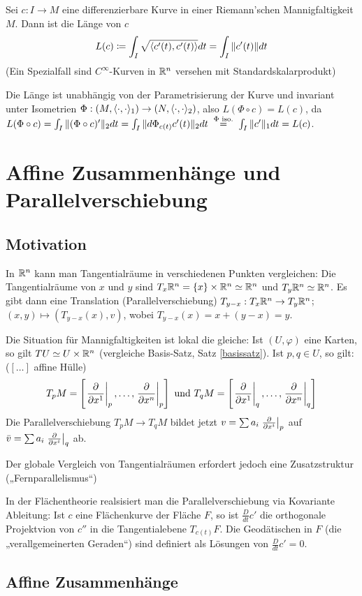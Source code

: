 \documentclass[a4paper,twoside,DIV15,BCOR12mm]{scrbook}
\renewcommand{\da}{\coloneqq}
\begin{document}
Sei $c: I \to M$ eine differenzierbare Kurve in einer Riemann’schen Mannigfaltigkeit $M$. Dann ist die Länge von $c$
\[
L(c) \da \int_I \sqrt{\ksp {c'(t)}{c'(t)}}dt  = \int _I \|c'(t)\|dt
\]
(Ein Spezialfall sind $C^\infty$-Kurven in $\mathbb{R}^n$ versehen mit Standardskalarprodukt)

Die Länge ist unabhängig von der Parametrisierung der Kurve und invariant unter Isometrien $\Phi : (M,\langle\cdot,\cdot\rangle_1) \to (N,\langle\cdot,\cdot\rangle_2)$, also $L(\Phi \circ c) = L(c)$, da $L(\Phi \circ c) = \int_I\|(\Phi \circ c)'\|_2dt = \int_I\|d\Phi_{c(t)}c'(t)\|_2dt \gleichnach{$\Phi$ iso.} \int_I\|c'\|_1dt = L(c)$.


\chapter{Affine Zusammenhänge und Parallelverschiebung}

\section{Motivation}

In $\mathbb{R}^n$ kann man Tangentialräume in verschiedenen Punkten vergleichen:
Die Tangentialräume von $x$ und $y$ sind $T_x\mathbb{R}^n = \{x\}\times \mathbb{R}^n \simeq \mathbb{R}^n$ und $T_y\mathbb{R}^n \simeq \mathbb{R}^n$. Es gibt dann eine Translation (Parallelverschiebung) $T_{y-x}:T_x\mathbb{R}^n \to T_y\mathbb{R}^n$; $(x,y)\mapsto (T_{y-x}(x), v)$, wobei $T_{y-x}(x) = x + (y-x) = y$.

Die Situation für Mannigfaltigkeiten ist lokal die gleiche: Ist $(U,\varphi)$ eine Karten, so gilt $TU \simeq U\times\mathbb{R}^n$ (vergleiche Basis-Satz, Satz \ref{basissatz}). Ist $p,q\in U$, so gilt: ($[\ldots]$ affine Hülle)
\[ T_pM = \left[ \left.\frac{\partial}{\partial x^{1}}\right|_p,\ldots, \left.\frac{\partial}{\partial x^{n}}\right|_p \right] \text{ und } T_qM = \left[ 
\left.\frac{\partial}{\partial x^{1}}\right|_q ,\ldots, \left.\frac{\partial}{\partial x^{n}}\right|_q
 \right] \]
 Die Parallelverschiebung $T_pM \to T_qM$ bildet jetzt 
$v=\sum a_i \left.\frac{\partial}{\partial x^{i}}\right|_p$ auf $\bar v = \sum a_i \left.\frac{\partial}{\partial x^{i}}\right|_q$ ab.

Der globale Vergleich von Tangentialräumen erfordert jedoch eine Zusatzstruktur („Fernparallelismus“)

In der Flächentheorie realsisiert man die Parallelverschiebung via Kovariante Ableitung: Ist $c$ eine Flächenkurve der Fläche $F$, so ist $\frac D {dt} c'$ die orthogonale Projektvion von $c''$  in die Tangentialebene $T_{c(t)}F$. Die Geodätischen in $F$ (die „verallgemeinerten Geraden“) sind definiert als Lösungen von $\frac D {dt} c' = 0$.

\section{Affine Zusammenhänge}
\end{document}
